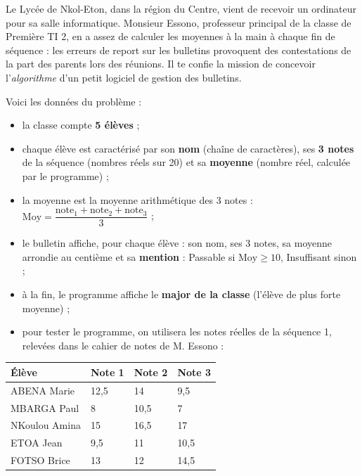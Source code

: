 \documentclass[11pt]{article}
\newcounter{popsec}
\newcounter{popsub}
\newcommand{\courssub}[1]{%
  \stepcounter{popsub}%
  \par\vspace{9pt}\noindent{\popxbold\fontsize{11.5}{13}\selectfont\color{popink}{\color{poporange}\thepopsec.\thepopsub}\hspace{6pt}#1}\par\nopagebreak\vspace{4pt}
}
\begin{document}
\courssub{Situation}

Le Lycée de Nkol-Eton, dans la région du Centre, vient de recevoir un ordinateur pour sa salle informatique. Monsieur Essono, professeur principal de la classe de Première TI 2, en a assez de calculer les moyennes à la main à chaque fin de séquence : les erreurs de report sur les bulletins provoquent des contestations de la part des parents lors des réunions. Il te confie la mission de concevoir l'\emph{algorithme} d'un petit logiciel de gestion des bulletins.

Voici les données du problème :

\begin{itemize}
  \item la classe compte \textbf{5 élèves} ;
  \item chaque élève est caractérisé par son \textbf{nom} (chaîne de caractères), ses \textbf{3 notes} de la séquence (nombres réels sur 20) et sa \textbf{moyenne} (nombre réel, calculée par le programme) ;
  \item la moyenne est la moyenne arithmétique des 3 notes : $\text{Moy} = \dfrac{\text{note}_1 + \text{note}_2 + \text{note}_3}{3}$ ;
  \item le bulletin affiche, pour chaque élève : son nom, ses 3 notes, sa moyenne arrondie au centième et sa \textbf{mention} : \og Passable \fg{} si $\text{Moy} \geq 10$, \og Insuffisant \fg{} sinon ;
  \item à la fin, le programme affiche le \textbf{major de la classe} (l'élève de plus forte moyenne) ;
  \item pour tester le programme, on utilisera les notes réelles de la séquence 1, relevées dans le cahier de notes de M. Essono :
\end{itemize}

\begin{center}
\begin{tabularx}{\linewidth}{|l|X|X|X|}
\hline
\rowcolor{popblueL} \textbf{Élève} & \textbf{Note 1} & \textbf{Note 2} & \textbf{Note 3} \\
\hline
ABENA Marie & 12,5 & 14 & 9,5 \\
\hline
MBARGA Paul & 8 & 10,5 & 7 \\
\hline
NKoulou Amina & 15 & 16,5 & 17 \\
\hline
ETOA Jean & 9,5 & 11 & 10,5 \\
\hline
FOTSO Brice & 13 & 12 & 14,5 \\
\hline
\end{tabularx}
\end{center}
\end{document}
